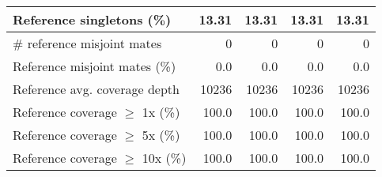 \documentclass[12pt,a4paper]{article}
\begin{document}
\begin{table}[ht]
\begin{center}
\begin{tabular}{|l*{4}{|r}|}
Reference singletons (\%) & 13.31 & 13.31 & 13.31 & 13.31 \\ \hline
\# reference misjoint mates & 0 & 0 & 0 & 0 \\ \hline
Reference misjoint mates (\%) & 0.0 & 0.0 & 0.0 & 0.0 \\ \hline
Reference avg. coverage depth & 10236 & 10236 & 10236 & 10236 \\ \hline
Reference coverage $\geq$ 1x (\%) & 100.0 & 100.0 & 100.0 & 100.0 \\ \hline
Reference coverage $\geq$ 5x (\%) & 100.0 & 100.0 & 100.0 & 100.0 \\ \hline
Reference coverage $\geq$ 10x (\%) & 100.0 & 100.0 & 100.0 & 100.0 \\ \hline
\end{tabular}
\end{center}
\end{table}
\end{document}
